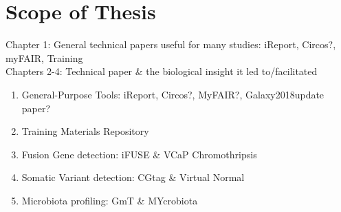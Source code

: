 \chapter*{Scope of Thesis}

Chapter 1: General technical papers useful for many studies: iReport, Circos?, myFAIR, Training \\
Chapters 2-4: Technical paper \& the biological insight it led to/facilitated \\

\begin{enumerate}
    \item General-Purpose Tools: iReport, Circos?, MyFAIR?, Galaxy2018update paper?
    \item Training Materials Repository
    \item Fusion Gene detection: iFUSE \& VCaP Chromothripsis
    \item Somatic Variant detection: CGtag \& Virtual Normal
    \item Microbiota profiling: GmT \& MYcrobiota
\end{enumerate}
